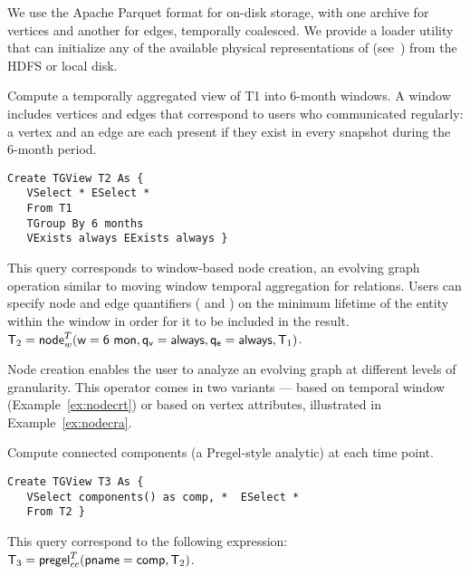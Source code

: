 We use the Apache Parquet format for on-disk storage, with one archive
for vertices and another for edges, temporally coalesced.  We provide
a loader utility that can initialize any of the available physical
representations of \tgs (see~\cite{PortalarXiv2016}) from the HDFS or
local disk.

\begin{example}
\label{ex:nodecrt}
\vspace{-0.1cm}

Compute a temporally aggregated view of T1 into 6-month windows.  A
window includes vertices and edges that correspond to users who
communicated regularly: a vertex and an edge are each present if they
exist in every snapshot during the 6-month period.

\begin{small} 
\begin{verbatim}
Create TGView T2 As { 
   VSelect * ESelect *
   From T1
   TGroup By 6 months
   VExists always EExists always }
\end{verbatim}
\vspace{-0.1cm}
\end{small}

This query corresponds to window-based node creation, an evolving
graph operation similar to moving window temporal aggregation for
relations.  Users can specify node and edge quantifiers
( and ) on the minimum
lifetime of the entity within the window in order for it to be
included in the result.  \\$\mathsf{T}_2 =
\textsf{node}^T_w(\mathsf{w=6~mon},\mathsf{q_v=always},\mathsf{q_e=always},\mathsf{T}_1)$.

\vspace{-0.3cm}
\end{example}

Node creation enables the user to analyze an evolving graph at
different levels of granularity.  This operator comes in two variants
--- based on temporal window (Example~\ref{ex:nodecrt}) or based
on vertex attributes, illustrated in Example~\ref{ex:nodecra}.

\begin{example}
\label{ex:cc}
\vspace{-0.1cm}

Compute connected components (a Pregel-style analytic) at each time
point. 

\begin{small} 
\begin{verbatim}
Create TGView T3 As { 
   VSelect components() as comp, *  ESelect *
   From T2 }
\end{verbatim}
\vspace{-0.1cm}
\end{small}

This query correspond to the following \tga expression:
$\mathsf{T}_3 = \textsf{pregel}^T_{cc} (\mathsf{pname=comp}, \mathsf{T}_2)$.

\vspace{-0.1cm}
\end{example}

